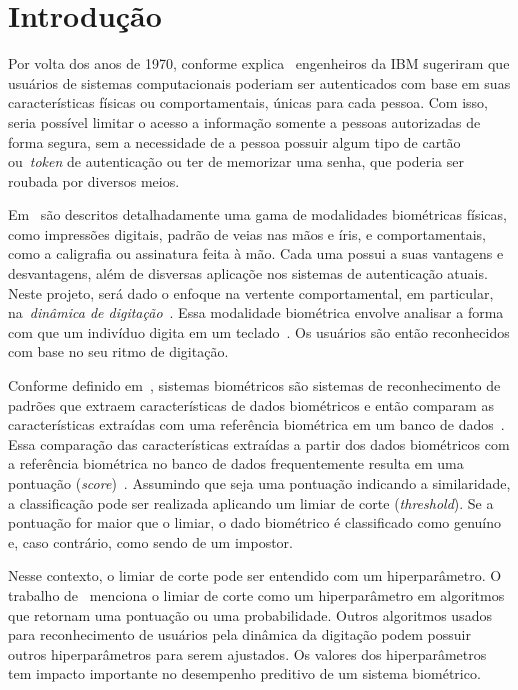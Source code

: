 \section{Introdução}\label{sec:introduacao}

Por volta dos anos de 1970, conforme explica~ engenheiros da IBM sugeriram que usuários de sistemas computacionais poderiam ser autenticados com base em suas características físicas ou comportamentais, únicas para cada pessoa. Com isso, seria possível limitar o acesso a informação somente a pessoas autorizadas de forma segura, sem a necessidade de a pessoa possuir algum tipo de cartão ou~\textit{token} de autenticação ou ter de memorizar uma senha, que poderia ser roubada por diversos meios.

Em~\cite{handbook_of_biometrics} são descritos detalhadamente uma gama de modalidades biométricas físicas, como impressões digitais, padrão de veias nas mãos e íris, e comportamentais, como a caligrafia ou assinatura feita à mão. Cada uma possui a suas vantagens e desvantagens, além de disversas aplicaçõe nos sistemas de autenticação atuais. Neste projeto, será dado o enfoque na vertente comportamental, em particular, na~\textit{dinâmica de digitação}~\cite{Roy2022systematic}. Essa modalidade biométrica envolve analisar a forma com que um indivíduo digita em um teclado~\cite{monrose2000keystroke}. Os usuários são então reconhecidos com base no seu ritmo de digitação.

Conforme definido em~\cite{Jain2004_IntroToBiometrics}, sistemas biométricos são sistemas de reconhecimento de padrões que extraem características de dados biométricos e então comparam as características extraídas com uma referência biométrica em um banco de dados~\cite{Jain2004_IntroToBiometrics}. Essa comparação das características extraídas a partir dos dados biométricos com a referência biométrica no banco de dados frequentemente resulta em uma pontuação (\textit{score})~\cite{Jain2016_50Years}. Assumindo que seja uma pontuação indicando a similaridade, a classificação pode ser realizada aplicando um limiar de corte (\textit{threshold}). Se a pontuação for maior que o limiar, o dado biométrico é classificado como genuíno e, caso contrário, como sendo de um impostor.

Nesse contexto, o limiar de corte pode ser entendido com um hiperparâmetro. O trabalho de~\cite{hpo_foundations_algorithms_and_open_challenges} menciona o limiar de corte como um hiperparâmetro em algoritmos que retornam uma pontuação ou uma probabilidade. Outros algoritmos usados para reconhecimento de usuários pela dinâmica da digitação podem possuir outros hiperparâmetros para serem ajustados. Os valores dos hiperparâmetros tem impacto importante no desempenho preditivo de um sistema biométrico.

